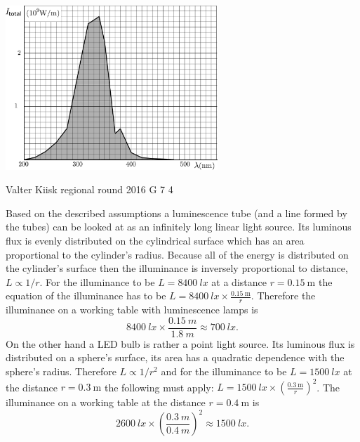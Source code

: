 \documentclass[11pt]{article}
\begin{document}
{\begin{center}
	\includegraphics[width=80mm]{2011-lahg-04-intensity-ing}
\end{center}
\fi
}

{Valter Kiisk} %
{regional round} %
{2016} %
{G 7} %
{4} %
{

\ifEngSolution
Based on the described assumptions a luminescence tube (and a line formed by the tubes) can be looked at as an infinitely long linear light source. Its luminous flux is evenly distributed on the cylindrical surface which has an area proportional to the cylinder’s radius. Because all of the energy is distributed on the cylinder’s surface then the illuminance is inversely proportional to distance, $L \propto 1/r$. For the illuminance to be $L=\SI{8400}{lx}$ at a distance $r=\SI{0.15}{\meter}$ the equation of the illuminance has to be $L=\SI{8400}{lx}\times \frac{\SI{0.15}{\meter}} r$. Therefore the illuminance on a working table with luminescence lamps is 
\[
\SI{8400}{lx}\times\frac{\SI{0.15}{m}}{\SI{1.8}{m}}\approx\SI{700}{lx}.
\]
On the other hand a LED bulb is rather a point light source. Its luminous flux is distributed on a sphere’s surface, its area has a quadratic dependence with the sphere’s radius. Therefore $L \propto 1/r^2$ and for the illuminance to be $L=\SI{1500}{lx}$ at the distance $r=\SI{0.3}{\meter}$ the following must apply: $L=\SI{1500}{lx}\times \left(\frac{\SI{0.3}{\meter}} {r}\right)^2$. The illuminance on a working table at the distance $r=\SI{0.4}{\meter}$ is
\[
\SI{2600}{lx}\times\left(\frac{\SI{0.3}{m}}{\SI{0.4}{m}}\right)^2\approx\SI{1500}{lx}.
\]
\fi
}
\end{document}
